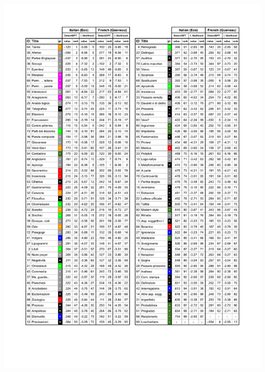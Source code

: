 \documentclass[
twocolumn,
]{ceurart}
\begin{document}
\begin{table}[!ht]
    \includegraphics[width=\textwidth]
    {Table.pdf}

\end{table}
\end{document}

